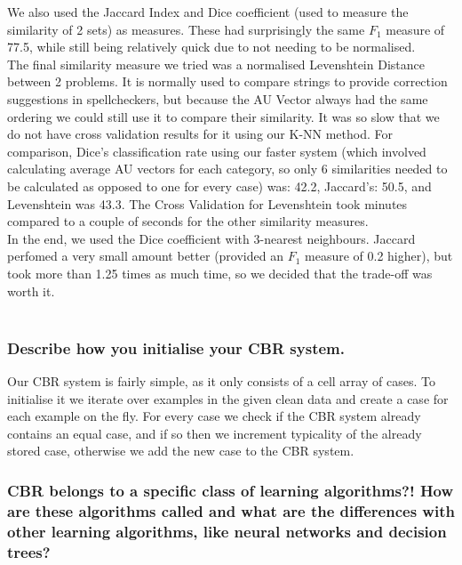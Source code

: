 \documentclass[12pt]{article}
\begin{document}
We also used the Jaccard Index and Dice coefficient (used to measure the similarity of 2 sets) as measures. These had surprisingly the same $F_1$ measure of 77.5, while still being relatively quick due to not needing to be normalised. \\

The final similarity measure we tried was a normalised Levenshtein Distance between 2 problems. It is normally used to compare strings to provide correction suggestions in spellcheckers, but because the AU Vector always had the same ordering we could still use it to compare their similarity. It was so slow that we do not have cross validation results for it using our K-NN method. For comparison, Dice's classification rate using our faster system (which involved calculating average AU vectors for each category, so only 6 similarities needed to be calculated as opposed to one for every case) was: 42.2, Jaccard's: 50.5, and Levenshtein was 43.3. The Cross Validation for Levenshtein took minutes compared to a couple of seconds for the other similarity measures.  \\

In the end, we used the Dice coefficient with 3-nearest neighbours. Jaccard perfomed a very small amount better (provided an $F_1$ measure of 0.2 higher), but took more than 1.25 times as much time, so we decided that the trade-off was worth it. \\ \\

\subsubsection*{Describe how you initialise your CBR system.}

Our CBR system is fairly simple, as it only consists of a cell array of cases. To initialise it we iterate over examples in the given clean data and create a case for each example on the fly. For every case we check if the CBR system already contains an equal case, and if so then we increment typicality of the already stored case, otherwise we add the new case to the CBR system.

\subsubsection*{CBR belongs to a specific class of learning algorithms?! How are these algorithms called and what are the differences with other learning algorithms, like neural networks and decision trees?}
\end{document}
